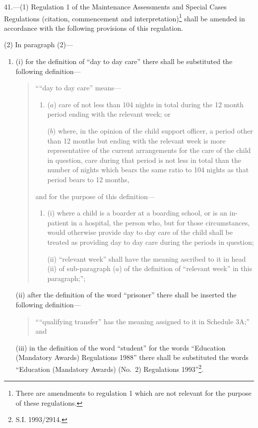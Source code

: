 \documentclass[a4paper]{article}
\begin{document}
41.—(1) Regulation 1 of the Maintenance Assessments and Special Cases Regulations (citation, commencement and interpretation)\footnote{\frenchspacing There are amendments to regulation 1 which are not relevant for the purpose of these regulations.} shall be amended in accordance with the following provisions of this regulation.

(2) In paragraph (2)—
\begin{enumerate}\item[]
(i) for the definition of “day to day care” there shall be substituted the following definition—
\begin{quotation}
““day to day care” means—
\begin{enumerate}\item[]
($a$) care of not less than 104 nights in total during the 12 month period ending with the relevant week; or

($b$) where, in the opinion of the child support officer, a period other than 12 months but ending with the relevant week is more representative of the current arrangements for the care of the child in question, care during that period is not less in total than the number of nights which bears the same ratio to 104 nights as that period bears to 12 months,
\end{enumerate}
and for the purpose of this definition—
\begin{enumerate}\item[]
(i) where a child is a boarder at a boarding school, or is an in-patient in a hospital, the person who, but for those circumstances, would otherwise provide day to day care of the child shall be treated as providing day to day care during the periods in question;

(ii) “relevant week” shall have the meaning ascribed to it in head (ii) of sub-paragraph ($a$) of the definition of “relevant week” in this paragraph;”;
\end{enumerate}
\end{quotation}

(ii) after the definition of the word “prisoner” there shall be inserted the following definition—
\begin{quotation}
““qualifying transfer” has the meaning assigned to it in Schedule 3A;” and
\end{quotation}

(iii) in the definition of the word “student” for the words “Education (Mandatory Awards) Regulations 1988” there shall be substituted the words
“Education (Mandatory Awards) (No.\ 2) Regulations 1993”\footnote{\frenchspacing S.I. 1993/2914.}.
\end{enumerate}
\end{document}
